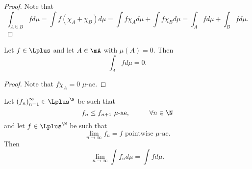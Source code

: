 \documentclass[pmath451]{subfiles}
\begin{document}
    \begin{proof}
        Note that
        \begin{equation*}
            \int_{A\cupdot B} fd\mu = \int f\left( \chi_A+\chi_B \right)d\mu = \int f\chi_Ad\mu + \int f\chi_Bd\mu = \int_Afd\mu + \int_Bfd\mu.
        \end{equation*}
    \end{proof}
    
    \begin{prop}{}
        Let $f\in\Lplus$ and let $A\in\mA$ with $\mu\left( A \right) = 0$. Then
        \begin{equation*}
            \int_Afd\mu = 0.
        \end{equation*}
    \end{prop}
    
    \begin{proof}
        Note that $f\chi_A=0$ $\mu$-ae.
    \end{proof}

    \begin{prop}{}
        Let $\left( f_{n} \right)^{\infty}_{n=1}\in\Lplus^{\N}$ be such that
        \begin{equation*}
            f_n\leq f_{n+1} \text{ $\mu$-ae},\hspace{1cm}\forall n\in\N
        \end{equation*}
        and let $f\in\Lplus^{\N}$ be such that
        \begin{equation*}
            \lim_{n\to\infty}f_n = f\text{ pointwise $\mu$-ae}.
        \end{equation*}
        Then
        \begin{equation*}
            \lim_{n\to\infty}\int f_nd\mu = \int fd\mu.
        \end{equation*}
    \end{prop}
\end{document}
